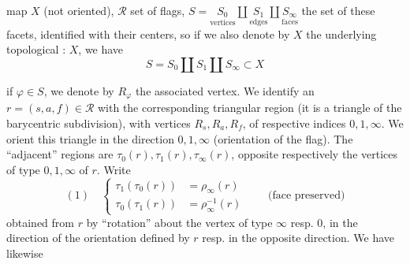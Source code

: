 
 map $X$ (not oriented), $\mathcal R$ set of flags,
$S=\underset{\text{vertices}}{S_0}\amalg\underset{\text{edges}}{S_1}\amalg\underset{\text{faces}}{S_\infty}$
the set of these facets, identified with  their centers, so if we also denote by $X$ the underlying topological  : $X$, we have
\[
 S=S_0\amalg S_1\amalg S_\infty\subset X
\]

if $\varphi\in S$, we denote by $R_\varphi$ the associated vertex. We identify an $r=(s,a,f)\in\mathcal R$ with the corresponding triangular region (it is a triangle of the barycentric subdivision), with vertices $R_s,R_a,R_f$, of respective indices $0,1,\infty$. We orient this triangle in the direction $0,1,\infty$ (orientation of the flag). The ``adjacent'' regions are $\tau_0(r),\tau_1(r),\tau_\infty(r)$, opposite respectively the vertices of type $0,1,\infty$ of $r$. Write
\[
 (1)\quad
 \left\{\begin{aligned}
 \tau_1(\tau_0(r))&=\rho_\infty(r)\\
 \tau_0(\tau_1(r))&=\rho_\infty^{-1}(r)
 \end{aligned}\right.
 \qquad\text{(face preserved)}
\]
obtained from $r$ by ``rotation''  about the vertex of type $\infty$ resp. $0$, in the  direction of the orientation defined by $r$ resp. in the opposite direction. We have likewise

